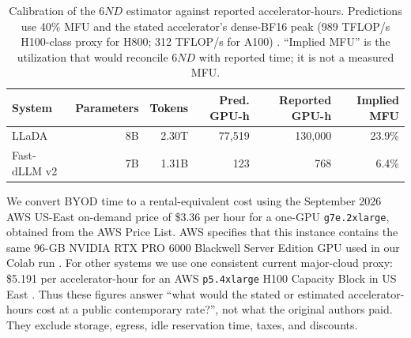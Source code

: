 \documentclass{article}
\begin{document}
\begin{table}[h]
\caption{Calibration of the $6ND$ estimator against reported accelerator-hours. Predictions use 40\% MFU and the stated accelerator's dense-BF16 peak (989 TFLOP/s H100-class proxy for H800; 312 TFLOP/s for A100) \citep{nvidiaH100,nvidiaA100}. ``Implied MFU'' is the utilization that would reconcile $6ND$ with reported time; it is not a measured MFU.}
\label{tab:compute-calibration}
\centering
\small
\begin{tabular}{lrrrrr}
\toprule
System & Parameters & Tokens & Pred. GPU-h & Reported GPU-h & Implied MFU \\
\midrule
LLaDA & 8B & 2.30T & 77,519 & 130,000 & 23.9\% \\
Fast-dLLM v2 & 7B & 1.31B & 123 & 768 & 6.4\% \\
\bottomrule
\end{tabular}
\end{table}

We convert BYOD time to a rental-equivalent cost using the September 2026 AWS US-East on-demand price of \$3.36 per hour for a one-GPU \texttt{g7e.2xlarge}, obtained from the AWS Price List. AWS specifies that this instance contains the same 96-GB NVIDIA RTX PRO 6000 Blackwell Server Edition GPU used in our Colab run \citep{awsPriceListG7e2026,awsG7e2026}. For other systems we use one consistent current major-cloud proxy: \$5.191 per accelerator-hour for an AWS \texttt{p5.4xlarge} H100 Capacity Block in US East \citep{awsCapacity2026}. Thus these figures answer ``what would the stated or estimated accelerator-hours cost at a public contemporary rate?'', not what the original authors paid. They exclude storage, egress, idle reservation time, taxes, and discounts.
\end{document}
